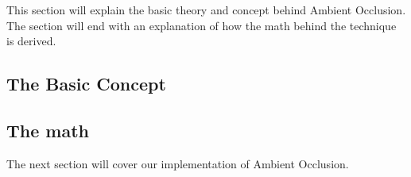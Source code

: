 This section will explain the basic theory and concept behind Ambient Occlusion. The section will end with an explanation of how the math behind the technique is derived.

\subsection{The Basic Concept}


\subsection*{The math}


The next section will cover our implementation of Ambient Occlusion.